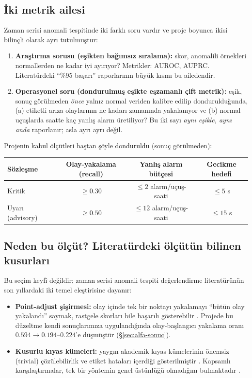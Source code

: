 \documentclass[11pt,a4paper]{article}
\begin{document}
\subsection{İki metrik ailesi}

Zaman serisi anomali tespitinde iki farklı soru vardır ve proje boyunca ikisi
bilinçli olarak ayrı tutulmuştur:

\begin{enumerate}[itemsep=2pt]
  \item \textbf{Araştırma sorusu (eşikten bağımsız sıralama):} skor, anomalili
        örnekleri normallerden ne kadar iyi ayırıyor? Metrikler: AUROC, AUPRC.
        Literatürdeki ``\%95 başarı'' raporlarının büyük kısmı bu ailedendir.
  \item \textbf{Operasyonel soru (dondurulmuş eşikte eşzamanlı çift metrik):}
        eşik, sonuç görülmeden \emph{önce} yalnız normal veriden kalibre edilip
        dondurulduğunda, (a) etiketli arıza olaylarının ne kadarı zamanında
        yakalanıyor ve (b) normal uçuşlarda saatte kaç yanlış alarm üretiliyor?
        Bu iki sayı \emph{aynı eşikle, aynı anda} raporlanır; asla ayrı ayrı
        değil.
\end{enumerate}

Projenin kabul ölçütleri baştan şöyle donduruldu (sonuç görülmeden):

\begin{center}
\small
\begin{tabular}{lccc}
\toprule
Sözleşme & Olay-yakalama (recall) & Yanlış alarm bütçesi & Gecikme hedefi \\
\midrule
Kritik   & $\geq 0.30$ & $\leq 2$ alarm/uçuş-saati  & $\leq 5$ s \\
Uyarı (advisory) & $\geq 0.50$ & $\leq 12$ alarm/uçuş-saati & $\leq 15$ s \\
\bottomrule
\end{tabular}
\end{center}

\subsection{Neden bu ölçüt? Literatürdeki ölçütün bilinen kusurları}

Bu seçim keyfî değildir; zaman serisi anomali tespiti değerlendirme
literatürünün son yıllardaki iki temel eleştirisine dayanır:

\begin{itemize}[itemsep=2pt]
  \item \textbf{Point-adjust şişirmesi:} olay içinde tek bir noktayı yakalamayı
        ``bütün olay yakalandı'' saymak, rastgele skorları bile başarılı
        gösterebilir \cite{kim2022rigorous}. Projede bu düzeltme kendi
        sonuçlarımıza uygulandığında olay-başlangıcı yakalama oranı
        $0.594 \to 0.194\text{--}0.224$'e düşmüştür (\S\ref{sec:alfa-sonuc}).
  \item \textbf{Kusurlu kıyas kümeleri:} yaygın akademik kıyas kümelerinin
        önemsiz (trivial) çözülebilirlik ve etiket hataları içerdiği
        gösterilmiştir \cite{wu2021flawed}. Kapsamlı karşılaştırmalar, tek bir
        yöntemin genel üstünlüğü olmadığını bulmaktadır \cite{schmidl2022eval}.
\end{itemize}
\end{document}
